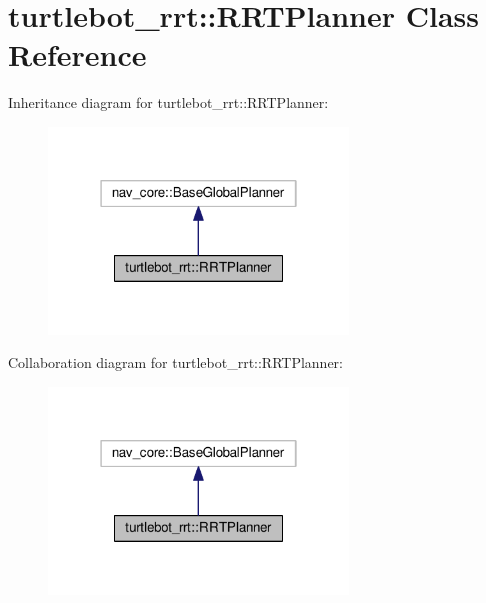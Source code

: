 \hypertarget{classturtlebot__rrt_1_1RRTPlanner}{}\section{turtlebot\+\_\+rrt\+:\+:R\+R\+T\+Planner Class Reference}
\label{classturtlebot__rrt_1_1RRTPlanner}


Inheritance diagram for turtlebot\+\_\+rrt\+:\+:R\+R\+T\+Planner\+:
\nopagebreak
\begin{figure}[H]
\begin{center}
\leavevmode
\includegraphics[width=226pt]{classturtlebot__rrt_1_1RRTPlanner__inherit__graph}
\end{center}
\end{figure}


Collaboration diagram for turtlebot\+\_\+rrt\+:\+:R\+R\+T\+Planner\+:
\nopagebreak
\begin{figure}[H]
\begin{center}
\leavevmode
\includegraphics[width=226pt]{classturtlebot__rrt_1_1RRTPlanner__coll__graph}
\end{center}
\end{figure}
